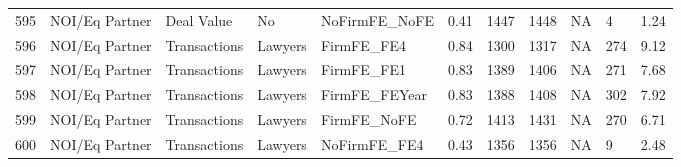 \documentclass{article}
\begin{document}
\begin{table}[H]
\begin{tabular}{rllllllllll}
  595 & NOI/Eq Partner & Deal Value & No & NoFirmFE\_NoFE & 0.41 & 1447 & 1448 & NA & 4 & 1.24 \\ 
  596 & NOI/Eq Partner & Transactions & Lawyers & FirmFE\_FE4 & 0.84 & 1300 & 1317 & NA & 274 & 9.12 \\ 
  597 & NOI/Eq Partner & Transactions & Lawyers & FirmFE\_FE1 & 0.83 & 1389 & 1406 & NA & 271 & 7.68 \\ 
  598 & NOI/Eq Partner & Transactions & Lawyers & FirmFE\_FEYear & 0.83 & 1388 & 1408 & NA & 302 & 7.92 \\ 
  599 & NOI/Eq Partner & Transactions & Lawyers & FirmFE\_NoFE & 0.72 & 1413 & 1431 & NA & 270 & 6.71 \\ 
  600 & NOI/Eq Partner & Transactions & Lawyers & NoFirmFE\_FE4 & 0.43 & 1356 & 1356 & NA & 9 & 2.48 \\ 
   \hline
\end{tabular}
\end{table}
\end{document}
